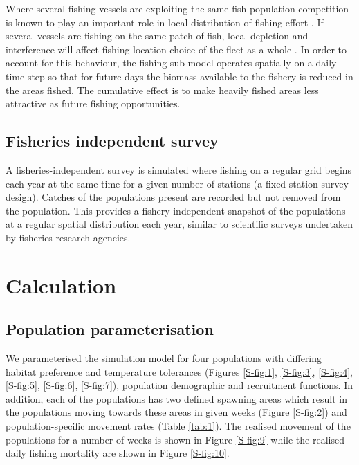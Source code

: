 \documentclass[review]{elsarticle}
\begin{document}
Where several fishing vessels are exploiting the same fish population
competition is known to play an important role in local distribution of fishing
effort \citep{Gillis1998}. If several vessels are fishing on the same patch of
fish, local depletion and interference will affect fishing location choice of
the fleet as a whole \citep{Rijnsdorp2000, Poos2007a}. In order to account for
this behaviour, the fishing sub-model operates spatially on a daily time-step
so that for future days the biomass available to the fishery is reduced in the
areas fished. The cumulative effect is to make heavily fished areas less
attractive as future fishing opportunities. 

\subsection{Fisheries independent survey}

A fisheries-independent survey is simulated where fishing on a regular grid
begins each year at the same time for a given number of stations (a fixed
station survey design). Catches of the populations present are recorded but not
removed from the population. This provides a fishery independent snapshot of
the populations at a regular spatial distribution each year, similar to
scientific surveys undertaken by fisheries research agencies. 

\section{Calculation}

%
\subsection{Population parameterisation}

We parameterised the simulation model for four populations with differing
habitat preference and temperature tolerances (Figures \ref{S-fig:1},
\ref{S-fig:3}, \ref{S-fig:4}, \ref{S-fig:5}, \ref{S-fig:6}, \ref{S-fig:7}),
population demographic and recruitment functions. In addition, each of the
populations has two defined spawning areas which result in the populations
moving towards these areas in given weeks (Figure \ref{S-fig:2}) and
population-specific movement rates (Table \ref{tab:1}). The realised movement
of the populations for a number of weeks is shown in Figure \ref{S-fig:9} while
the realised daily fishing mortality are shown in Figure \ref{S-fig:10}. \\
\end{document}
